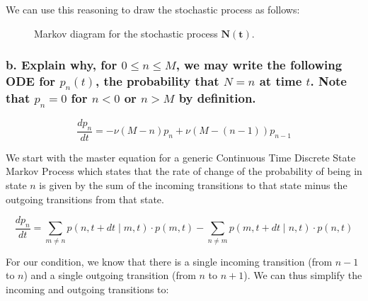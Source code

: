 \documentclass{article}
\begin{document}
We can use this reasoning to draw the stochastic process as follows:

\begin{figure}[h]
    \centering
    \caption{\centering Markov diagram for the stochastic process $\mathbf{N(t)}$.}\label{fig:q2_process}
\end{figure}

\subsubsection*{b. Explain why, for $0 \leq n \leq M$, we may write the following ODE for $p_n(t)$, the probability that $N = n$ at time $t$. Note that $p_n = 0$ for $n < 0$ or $n > M$ by definition.}

\[
    \frac{dp_n}{dt} = -\nu(M - n)p_n + \nu(M - (n - 1))p_{n-1}
\]

We start with the master equation for a generic Continuous Time Discrete State
Markov Process which states that the rate of change of the probability of being
in state $n$ is given by the sum of the incoming transitions to that state
minus the outgoing transitions from that state.

\[
    \frac{dp_n}{dt} = \sum_{m \ne n} p(n, t+dt \mid m, t) \cdot p(m, t) - \sum_{n \ne m} p(m, t+dt \mid n, t) \cdot p(n, t)
\]

For our condition, we know that there is a single incoming transition (from
$n-1$ to $n$) and a single outgoing transition (from $n$ to $n+1$). We can thus
simplify the incoming and outgoing transitions to:
\end{document}

